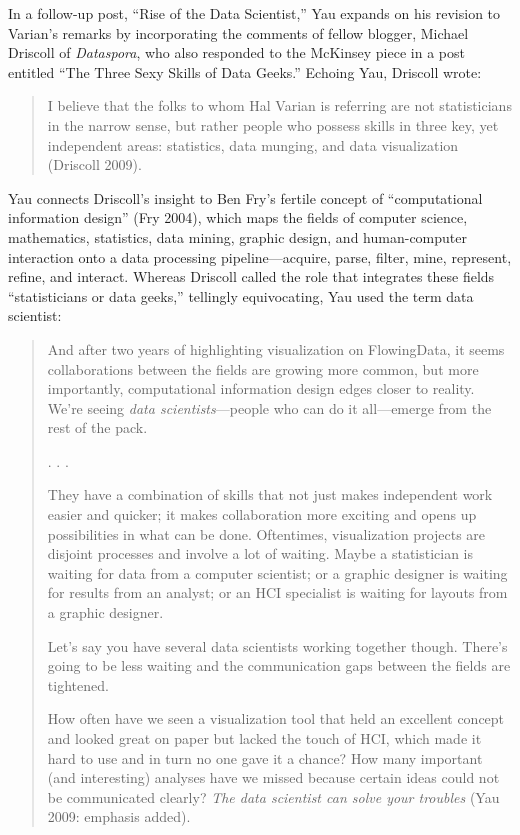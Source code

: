 \documentclass[
  letterpaper,
]{report}
\begin{document}
In a follow-up post, ``Rise of the Data Scientist,'' Yau expands on his
revision to Varian's remarks by incorporating the comments of fellow
blogger, Michael Driscoll of \emph{Dataspora}, who also responded to the
McKinsey piece in a post entitled ``The Three Sexy Skills of Data
Geeks.'' Echoing Yau, Driscoll wrote:

\begin{quote}
I believe that the folks to whom Hal Varian is referring are not
statisticians in the narrow sense, but rather people who possess skills
in three key, yet independent areas: statistics, data munging, and data
visualization (Driscoll 2009).
\end{quote}

Yau connects Driscoll's insight to Ben Fry's fertile concept of
``computational information design'' (Fry 2004), which maps the fields
of computer science, mathematics, statistics, data mining, graphic
design, and human-computer interaction onto a data processing
pipeline---acquire, parse, filter, mine, represent, refine, and
interact. Whereas Driscoll called the role that integrates these fields
``statisticians or data geeks,'' tellingly equivocating, Yau used the
term data scientist:

\begin{quote}
And after two years of highlighting visualization on FlowingData, it
seems collaborations between the fields are growing more common, but
more importantly, computational information design edges closer to
reality. We're seeing \emph{data scientists}---people who can do it
all---emerge from the rest of the pack.

. . .

They have a combination of skills that not just makes independent work
easier and quicker; it makes collaboration more exciting and opens up
possibilities in what can be done. Oftentimes, visualization projects
are disjoint processes and involve a lot of waiting. Maybe a
statistician is waiting for data from a computer scientist; or a graphic
designer is waiting for results from an analyst; or an HCI specialist is
waiting for layouts from a graphic designer.

Let's say you have several data scientists working together though.
There's going to be less waiting and the communication gaps between the
fields are tightened.

How often have we seen a visualization tool that held an excellent
concept and looked great on paper but lacked the touch of HCI, which
made it hard to use and in turn no one gave it a chance? How many
important (and interesting) analyses have we missed because certain
ideas could not be communicated clearly? \emph{The data scientist can
solve your troubles} (Yau 2009: emphasis added).
\end{quote}
\end{document}
